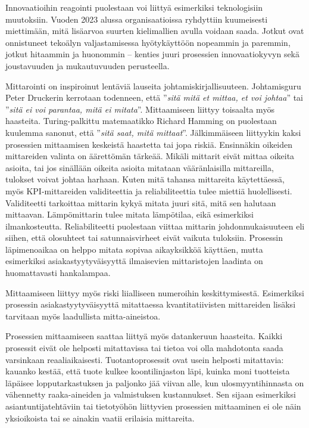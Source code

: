 \documentclass[
  finnish,
  letterpaper,
  DIV=11,
  numbers=noendperiod,
  oneside]{scrreprt}
\begin{document}
Innovaatioihin reagointi puolestaan voi liittyä esimerkiksi
teknologisiin muutoksiin. Vuoden 2023 alussa organisaatioissa ryhdyttiin
kuumeisesti miettimään, mitä lisäarvoa suurten kielimallien avulla
voidaan saada. Jotkut ovat onnistuneet tekoälyn valjastamisessa
hyötykäyttöön nopeammin ja paremmin, jotkut hitaammin ja huonommin --
kenties juuri prosessien innovaatiokyvyn sekä joustavuuden ja
mukautuvuuden perusteella.

Mittarointi on inspiroinut lentäviä lauseita johtamiskirjallisuuteen.
Johtamisguru Peter Druckerin kerrotaan todenneen, että ''\emph{sitä mitä et
mittaa, et voi johtaa}'' tai ''\emph{sitä ei voi parantaa, mitä ei
mitata}''. Mittaamiseen liittyy toisaalta myös haasteita.
Turing-palkittu matemaatikko Richard Hamming on puolestaan kuulemma
sanonut, että ''\emph{sitä saat, mitä mittaat}''. Jälkimmäiseen
liittyykin kaksi prosessien mittaamisen keskeistä haastetta tai jopa
riskiä. Ensinnäkin oikeiden mittareiden valinta on äärettömän tärkeää.
Mikäli mittarit eivät mittaa oikeita asioita, tai jos sinällään oikeita
asioita mitataan vääränlaisilla mittareilla, tulokset voivat johtaa
harhaan. Kuten mitä tahansa mittareita käytettäessä, myös
KPI-mittareiden validiteettia ja reliabiliteettia tulee miettiä
huolellisesti. Validiteetti tarkoittaa mittarin kykyä mitata juuri sitä,
mitä sen halutaan mittaavan. Lämpömittarin tulee mitata lämpötilaa, eikä
esimerkiksi ilmankosteutta. Reliabiliteetti puolestaan viittaa mittarin
johdonmukaisuuteen eli siihen, että olosuhteet tai satunnaisvirheet
eivät vaikuta tuloksiin. Prosessin läpimenoaikaa on helppo mitata
sopivaa aikayksikköä käyttäen, mutta esimerkiksi asiakastyytyväisyyttä
ilmaisevien mittaristojen laadinta on huomattavasti hankalampaa.

Mittaamiseen liittyy myös riski liialliseen numeroihin keskittymisestä.
Esimerkiksi prosessin asiakastyytyväisyyttä mitattaessa
kvantitatiivisten mittareiden lisäksi tarvitaan myös laadullista
mitta-aineistoa.

Prosessien mittaamiseen saattaa liittyä myös datankeruun haasteita.
Kaikki prosessit eivät ole helposti mitattavissa tai tietoa voi olla
mahdotonta saada varsinkaan reaaliaikaisesti. Tuotantoprosessit ovat
usein helposti mitattavia: kauanko kestää, että tuote kulkee
koontilinjaston läpi, kuinka moni tuotteista läpäisee lopputarkastuksen
ja paljonko jää viivan alle, kun ulosmyyntihinnasta on vähennetty
raaka-aineiden ja valmistuksen kustannukset. Sen sijaan esimerkiksi
asiantuntijatehtäviin tai tietotyöhön liittyvien prosessien mittaaminen
ei ole näin yksioikoista tai se ainakin vaatii erilaisia mittareita.
\end{document}
